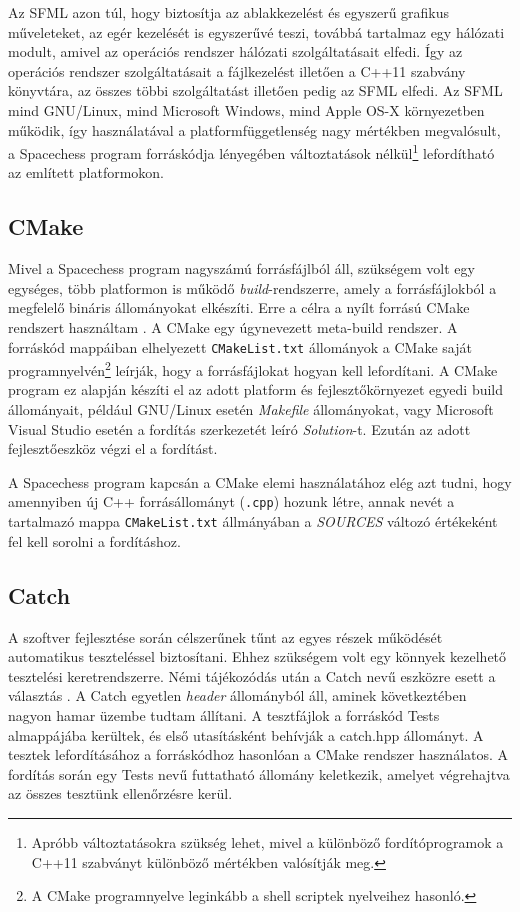 \documentclass[12pt, twoside]{report}
\begin{document}
Az SFML azon túl, hogy biztosítja az ablakkezelést és egyszerű grafikus műveleteket, az egér kezelését is egyszerűvé teszi, továbbá tartalmaz egy hálózati modult, amivel az operációs rendszer hálózati szolgáltatásait elfedi. Így az operációs rendszer szolgáltatásait a fájlkezelést illetően a C++11 szabvány könyvtára, az összes többi szolgáltatást illetően pedig az SFML elfedi. Az SFML mind GNU/Linux, mind Microsoft Windows, mind Apple OS-X környezetben működik, így használatával a platformfüggetlenség nagy mértékben megvalósult, a Spacechess program forráskódja lényegében változtatások nélkül\footnote{Apróbb változtatásokra szükség lehet, mivel a különböző fordítóprogramok a C++11 szabványt különböző mértékben valósítják meg.} lefordítható az említett platformokon. 

\subsection{CMake}

Mivel a Spacechess program nagyszámú forrásfájlból áll, szükségem volt egy egységes, több platformon is működő \emph{build}-rendszerre, amely a forrásfájlokból a megfelelő bináris állományokat elkészíti. Erre a célra a nyílt forrású CMake rendszert használtam \cite{cmake}. A CMake egy úgynevezett meta-build rendszer. A forráskód mappáiban elhelyezett {\tt CMakeList.txt} állományok a CMake saját programnyelvén\footnote{A CMake programnyelve leginkább a shell scriptek nyelveihez hasonló.} leírják, hogy a forrásfájlokat hogyan kell lefordítani. A CMake program ez alapján készíti el az adott platform és fejlesztőkörnyezet egyedi build állományait, például GNU/Linux esetén \emph{Makefile} állományokat, vagy Microsoft Visual Studio esetén a fordítás szerkezetét leíró \emph{Solution}-t. Ezután az adott fejlesztőeszköz végzi el a fordítást.

A Spacechess program kapcsán a CMake elemi használatához elég azt tudni, hogy amennyiben új C++ forrásállományt ({\tt *.cpp}) hozunk létre, annak nevét a tartalmazó mappa {\tt CMakeList.txt} állmányában a \emph{SOURCES} változó értékeként fel kell sorolni a fordításhoz.

\subsection{Catch}

A szoftver fejlesztése során célszerűnek tűnt az egyes részek működését automatikus teszteléssel biztosítani. Ehhez szükségem volt egy könnyek kezelhető tesztelési keretrendszerre. Némi tájékozódás után a Catch nevű eszközre esett a választás \cite{catch}. A Catch egyetlen \emph{header} állományból áll, aminek következtében nagyon hamar üzembe tudtam állítani. A tesztfájlok a forráskód Tests almappájába kerültek, és első utasításként behívják a catch.hpp állományt. A tesztek lefordításához a forráskódhoz hasonlóan a CMake rendszer használatos. A fordítás során egy Tests nevű futtatható állomány keletkezik, amelyet végrehajtva az összes tesztünk ellenőrzésre kerül.
\end{document}
